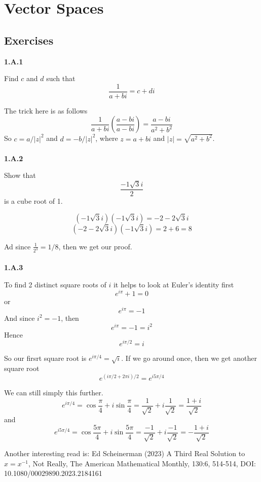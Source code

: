 \section{Vector Spaces}

\subsection{Exercises}

\textbf{1.A.1}

Find $c$ and $d$ such that
$$
\frac{1}{a + bi} = c + di
$$

The trick here is as follows
$$
\frac{1}{a + bi} \left( \frac{a - bi}{a - bi} \right)= \frac{a - bi}{a^2 + b^2}
$$
So $c = a / |z|^2$ and $d = -b / |z|^2$, where $z = a + bi$ and $|z| = \sqrt{a^2 + b^2}$.
\\~\\



\textbf{1.A.2}

Show that
$$
\frac{-1 \sqrt{3}i}{2}
$$
is a cube root of 1.

$$
(-1 \sqrt{3}i) (-1 \sqrt{3}i) = -2 -2\sqrt{3}i
$$
$$
(-2 -2\sqrt{3}i) (-1 \sqrt{3}i) = 2 + 6 = 8
$$

Ad since $\frac{1}{2^3} = 1/8$, then we get our proof.
\\~\\



\textbf{1.A.3}

To find 2 distinct square roots of $i$ it helps to look at Euler's identity first
$$
e^{i\pi} + 1 = 0
$$
or
$$
e^{i\pi} = -1
$$
And since $i^2 = -1$, then
$$
e^{i\pi} = -1 = i^2
$$
Hence
$$
e^{i\pi/2} = i
$$

So our firsrt square root is $e^{i\pi/4} = \sqrt{i}$.
If we go around once, then we get another square root
$$
e^{(i\pi/2 + 2\pi i)/2} = e^{i5\pi / 4}
$$

We can still simply this further.
$$
e^{i\pi/4} = \cos{\frac{\pi}{4}} + i\sin{\frac{\pi}{4}} = \frac{1}{\sqrt{2}} + i\frac{1}{\sqrt{2}}
= \frac{1 + i}{\sqrt{2}}
$$
and
$$
e^{i5\pi/4} = \cos{\frac{5\pi}{4}} + i\sin{\frac{5\pi}{4}} = \frac{-1}{\sqrt{2}} + i\frac{-1}{\sqrt{2}}
= - \frac{1 + i}{\sqrt{2}} 
$$

Another interesting read is:
Ed Scheinerman (2023) A Third Real Solution to $x=x^{-1}$, Not Really,
The American Mathematical Monthly, 130:6, 514-514, DOI: 10.1080/00029890.2023.2184161
\\~\\



